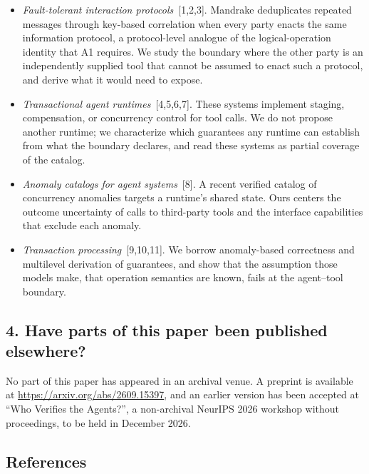 \documentclass[11pt,a4paper]{article}
\begin{document}
\begin{itemize}
\item \emph{Fault-tolerant interaction protocols}~[1,2,3]. Mandrake
deduplicates repeated messages through key-based correlation when every
party enacts the same information protocol, a protocol-level analogue of
the logical-operation identity that A1 requires. We study the boundary where the
other party is an independently supplied tool that cannot be assumed to
enact such a protocol, and derive what it would need to expose.
\item \emph{Transactional agent runtimes}~[4,5,6,7]. These systems
implement staging, compensation, or concurrency control for tool calls. We
do not propose another runtime; we characterize which guarantees any
runtime can establish from what the boundary declares, and read these
systems as partial coverage of the catalog.
\item \emph{Anomaly catalogs for agent systems}~[8]. A recent verified
catalog of concurrency anomalies targets a runtime's shared state. Ours
centers the outcome uncertainty of calls to third-party tools and the
interface capabilities that exclude each anomaly.
\item \emph{Transaction processing}~[9,10,11]. We borrow anomaly-based
correctness and multilevel derivation of guarantees, and show that the
assumption those models make, that operation semantics are known, fails at
the agent--tool boundary.
\end{itemize}

\subsection*{4. Have parts of this paper been published elsewhere?}

No part of this paper has appeared in an archival venue. A preprint is
available at \url{https://arxiv.org/abs/2609.15397}, and an earlier
version has been accepted at ``Who Verifies the Agents?'', a non-archival
NeurIPS 2026 workshop without proceedings, to be held in December 2026.

\subsection*{References}
\end{document}

